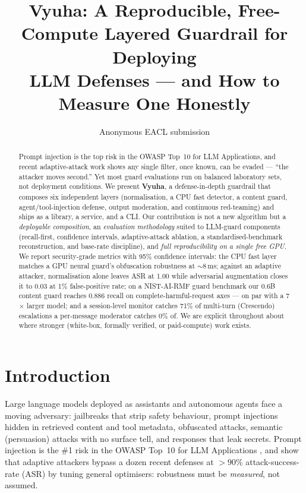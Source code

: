 \documentclass[11pt]{article}
\title{Vyuha: A Reproducible, Free-Compute Layered Guardrail for Deploying\\
LLM Defenses --- and How to Measure One Honestly}
\author{Anonymous EACL submission}
\begin{document}
\maketitle

\begin{abstract}
Prompt injection is the top risk in the OWASP Top~10 for LLM Applications, and recent
adaptive-attack work shows any single filter, once known, can be evaded --- ``the attacker moves
second.'' Yet most guard evaluations run on balanced laboratory sets, not deployment conditions.
We present \textbf{Vyuha}, a defense-in-depth guardrail that composes six independent layers
(normalisation, a CPU fast detector, a content guard, agent/tool-injection defense, output
moderation, and continuous red-teaming) and ships as a library, a service, and a CLI. Our
contribution is not a new algorithm but a \emph{deployable composition}, an
\emph{evaluation methodology} suited to LLM-guard components (recall-first, confidence intervals,
adaptive-attack ablation, a standardised-benchmark reconstruction, and base-rate discipline), and
\emph{full reproducibility on a single free GPU}. We report security-grade metrics with 95\%
confidence intervals: the CPU fast layer matches a GPU neural guard's obfuscation robustness at
$\sim$8\,ms; against an adaptive attacker, normalisation alone leaves ASR at 1.00 while adversarial
augmentation closes it to 0.03 at 1\% false-positive rate; on a NIST-AI-RMF guard benchmark our
0.6B content guard reaches 0.886 recall on complete-harmful-request axes --- on par with a 7$\times$
larger model; and a session-level monitor catches 71\% of multi-turn (Crescendo) escalations a
per-message moderator catches 0\% of. We are explicit throughout about where stronger
(white-box, formally verified, or paid-compute) work exists.
\end{abstract}

\section{Introduction}
Large language models deployed as assistants and autonomous agents face a moving adversary:
jailbreaks that strip safety behaviour, prompt injections hidden in retrieved content and tool
metadata, obfuscated attacks, semantic (persuasion) attacks with no surface tell,
and responses that leak secrets. Prompt injection is the \#1 risk in the OWASP Top~10 for LLM
Applications \citep{owasp-llm}, and \citet{attacker-second} show that adaptive attackers bypass a
dozen recent defenses at $>$90\% attack-success-rate (ASR) by tuning general optimisers: robustness
must be \emph{measured}, not assumed.
\end{document}
